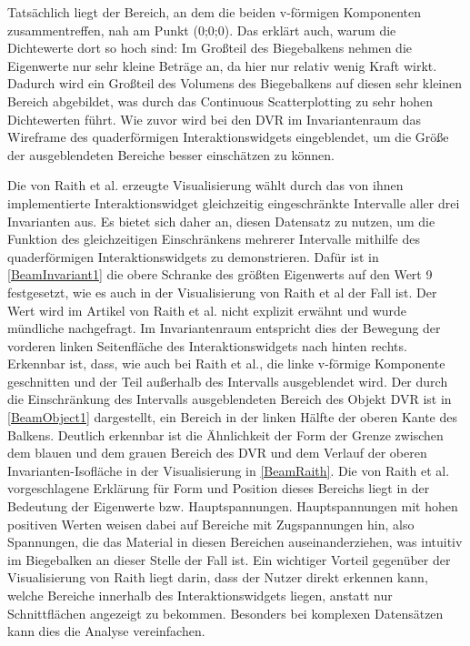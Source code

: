 \documentclass[a4paper,fontsize=12pt,toc=bib,parskip=half,ngerman]{scrartcl}
\begin{document}
Tats\"achlich liegt der Bereich, an dem die beiden v-f\"ormigen Komponenten zusammentreffen, nah am Punkt (0;0;0). Das erkl\"art auch, warum die Dichtewerte dort so hoch sind: Im Gro{\ss}teil des Biegebalkens nehmen die Eigenwerte nur sehr kleine Betr\"age an, da hier nur relativ wenig Kraft wirkt. Dadurch wird ein Gro{\ss}teil des Volumens des Biegebalkens auf diesen sehr kleinen Bereich abgebildet, was durch das Continuous Scatterplotting zu sehr hohen Dichtewerten f\"uhrt. Wie zuvor wird bei den DVR im Invariantenraum das Wireframe des quaderf\"ormigen Interaktionswidgets eingeblendet, um die Gr\"o{\ss}e der ausgeblendeten Bereiche besser einsch\"atzen zu k\"onnen.

Die von Raith et al. erzeugte Visualisierung w\"ahlt durch das von ihnen implementierte Interaktionswidget gleichzeitig eingeschr\"ankte Intervalle aller drei Invarianten aus. Es bietet sich daher an, diesen Datensatz zu nutzen, um die Funktion des gleichzeitigen Einschr\"ankens mehrerer Intervalle mithilfe des quaderf\"ormigen Interaktionswidgets zu demonstrieren. Daf\"ur ist in \cref{BeamInvariant1} die obere Schranke des gr\"o{\ss}ten Eigenwerts auf den Wert 9 festgesetzt, wie es auch in der Visualisierung von Raith et al der Fall ist. Der Wert wird im Artikel von Raith et al. nicht explizit erw\"ahnt und wurde m\"undliche nachgefragt. Im Invariantenraum entspricht dies der Bewegung der vorderen linken Seitenfl\"ache des Interaktionswidgets nach hinten rechts. Erkennbar ist, dass, wie auch bei Raith et al., die linke v-f\"ormige Komponente geschnitten und der Teil au{\ss}erhalb des Intervalls ausgeblendet wird. Der durch die Einschr\"ankung des Intervalls ausgeblendeten Bereich des Objekt DVR ist in \cref{BeamObject1} dargestellt, ein Bereich in der linken H\"alfte der oberen Kante des Balkens. Deutlich erkennbar ist die \"Ahnlichkeit der Form der Grenze zwischen dem blauen und dem grauen Bereich des DVR und dem Verlauf der oberen Invarianten-Isofl\"ache in der Visualisierung in \cref{BeamRaith}. Die von Raith et al. vorgeschlagene Erkl\"arung f\"ur Form und Position dieses Bereichs liegt in der Bedeutung der Eigenwerte bzw. Hauptspannungen. Hauptspannungen mit hohen positiven Werten weisen dabei auf Bereiche mit Zugspannungen hin, also Spannungen, die das Material in diesen Bereichen auseinanderziehen, was intuitiv im Biegebalken an dieser Stelle der Fall ist. Ein wichtiger Vorteil gegen\"uber der Visualisierung von Raith liegt darin, dass der Nutzer direkt erkennen kann, welche Bereiche innerhalb des Interaktionswidgets liegen, anstatt nur Schnittfl\"achen angezeigt zu bekommen. Besonders bei komplexen Datens\"atzen kann dies die Analyse vereinfachen.
\end{document}
